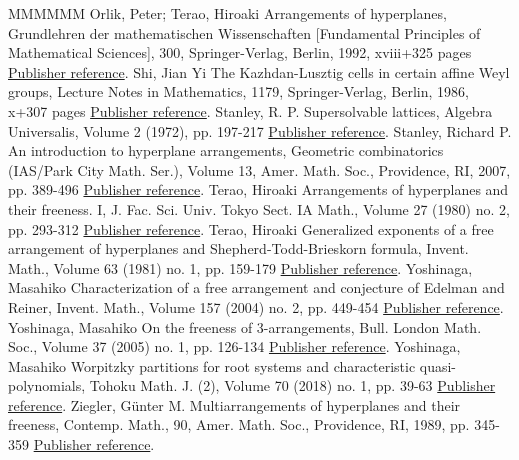 \documentclass[11pt]{article}
\theoremstyle{definition}
\numberwithin{equation}{section}
\begin{document}
\begin{thebibliography}{MMMMMM}
 Orlik, Peter; Terao, Hiroaki Arrangements of hyperplanes, Grundlehren der mathematischen Wissenschaften [Fundamental Principles of Mathematical Sciences], 300, Springer-Verlag, Berlin, 1992, xviii+325 pages \href{https://alco.centre-mersenne.org/articles/10.5802/alco.405/#OT92}{Publisher reference}.
 Shi, Jian Yi The Kazhdan-Lusztig cells in certain affine Weyl groups, Lecture Notes in Mathematics, 1179, Springer-Verlag, Berlin, 1986, x+307 pages \href{https://alco.centre-mersenne.org/articles/10.5802/alco.405/#Shi86}{Publisher reference}.
 Stanley, R. P. Supersolvable lattices, Algebra Universalis, Volume 2 (1972), pp. 197-217 \href{https://alco.centre-mersenne.org/articles/10.5802/alco.405/#St72}{Publisher reference}.
 Stanley, Richard P. An introduction to hyperplane arrangements, Geometric combinatorics (IAS/Park City Math. Ser.), Volume 13, Amer. Math. Soc., Providence, RI, 2007, pp. 389-496 \href{https://alco.centre-mersenne.org/articles/10.5802/alco.405/#St07}{Publisher reference}.
 Terao, Hiroaki Arrangements of hyperplanes and their freeness. I, J. Fac. Sci. Univ. Tokyo Sect. IA Math., Volume 27 (1980) no. 2, pp. 293-312 \href{https://alco.centre-mersenne.org/articles/10.5802/alco.405/#T80}{Publisher reference}.
 Terao, Hiroaki Generalized exponents of a free arrangement of hyperplanes and Shepherd-Todd-Brieskorn formula, Invent. Math., Volume 63 (1981) no. 1, pp. 159-179 \href{https://alco.centre-mersenne.org/articles/10.5802/alco.405/#T81}{Publisher reference}.
 Yoshinaga, Masahiko Characterization of a free arrangement and conjecture of Edelman and Reiner, Invent. Math., Volume 157 (2004) no. 2, pp. 449-454 \href{https://alco.centre-mersenne.org/articles/10.5802/alco.405/#Yo04}{Publisher reference}.
 Yoshinaga, Masahiko On the freeness of 3-arrangements, Bull. London Math. Soc., Volume 37 (2005) no. 1, pp. 126-134 \href{https://alco.centre-mersenne.org/articles/10.5802/alco.405/#Yo05}{Publisher reference}.
 Yoshinaga, Masahiko Worpitzky partitions for root systems and characteristic quasi-polynomials, Tohoku Math. J. (2), Volume 70 (2018) no. 1, pp. 39-63 \href{https://alco.centre-mersenne.org/articles/10.5802/alco.405/#Y18W}{Publisher reference}.
 Ziegler, Günter M. Multiarrangements of hyperplanes and their freeness, Contemp. Math., 90, Amer. Math. Soc., Providence, RI, 1989, pp. 345-359 \href{https://alco.centre-mersenne.org/articles/10.5802/alco.405/#Z89}{Publisher reference}.
\end{thebibliography}
\end{document}
